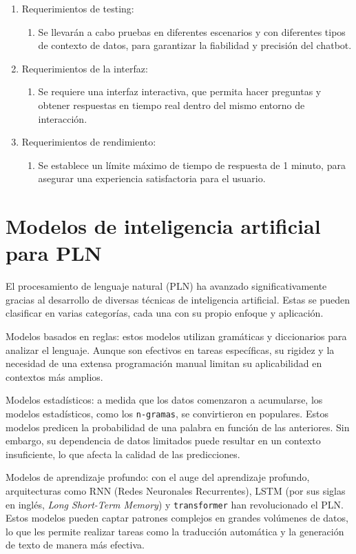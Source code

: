 \begin{enumerate}
    \item Requerimientos de testing:
        \begin{enumerate}
            \item Se llevarán a cabo pruebas en diferentes escenarios y con diferentes tipos de contexto de datos, para garantizar la fiabilidad y precisión del chatbot.
         \end{enumerate}
    \item Requerimientos de la interfaz:
        \begin{enumerate}
            \item Se requiere una interfaz interactiva, que permita hacer preguntas y obtener respuestas en tiempo real dentro del mismo entorno de interacción.
        \end{enumerate}
    \item Requerimientos de rendimiento:
        \begin{enumerate} 
            \item Se establece un límite máximo de tiempo de respuesta de 1 minuto, para asegurar una experiencia satisfactoria para el usuario.
        \end{enumerate}
  \end{enumerate}


  \section{Modelos de inteligencia artificial para PLN}
  El procesamiento de lenguaje natural (PLN) ha avanzado significativamente gracias al desarrollo de diversas técnicas de inteligencia artificial. Estas se pueden clasificar en varias categorías, cada una con su propio enfoque y aplicación.
     
  Modelos basados en reglas: estos modelos utilizan gramáticas y diccionarios para analizar el lenguaje. Aunque son efectivos en tareas específicas, su rigidez y la necesidad de una extensa programación manual limitan su aplicabilidad en contextos más amplios.
  
  Modelos estadísticos: a medida que los datos comenzaron a acumularse, los modelos estadísticos, como los \texttt{n-gramas}, se convirtieron en populares. Estos modelos predicen la probabilidad de una palabra en función de las anteriores. Sin embargo, su dependencia de datos limitados puede resultar en un contexto insuficiente, lo que afecta la calidad de las predicciones.
  
  Modelos de aprendizaje profundo: con el auge del aprendizaje profundo, arquitecturas como RNN (Redes Neuronales Recurrentes), LSTM (por sus siglas en inglés, \textit{Long Short-Term Memory}) y \texttt{transformer} han revolucionado el PLN. Estos modelos pueden captar patrones complejos en grandes volúmenes de datos, lo que les permite realizar tareas como la traducción automática y la generación de texto de manera más efectiva.
  
